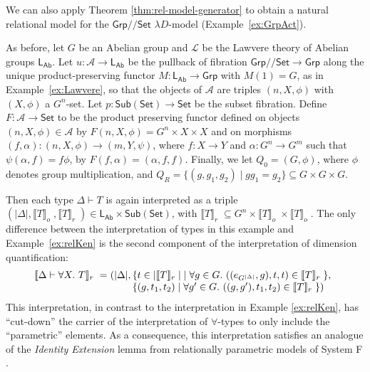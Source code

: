 \documentclass[a4paper,UKenglish]{lipics}
\newcommand{\msf}[1]{\mathsf{#1}} %
\newcommand{\Grp}{\msf{Grp}}
\newcommand{\Set}{\msf{Set}}
\newcommand{\Sub}[1]{\msf{Sub}(#1)}
\newcommand{\LAb}{\msf{L}_{\msf{Ab}}}
\newcommand{\A}{\mathcal{A}}
\newcommand{\Lslice}[1]{#1/\!/\Set}
\newcommand{\GrpSet}{\Lslice{\Grp}}
\newcommand{\semo}[1]{\ensuremath{\llbracket #1 \rrbracket _o} \;}
\newcommand{\semr}[1]{\ensuremath{\llbracket #1 \rrbracket _r} \;}
\begin{document}
We can also apply Theorem \ref{thm:rel-model-generator} to obtain a natural relational model for the $\GrpSet$ $\lambda D$-model (Example~\ref{ex:GrpAct}).

\begin{example}\label{ex:relMon}
As before, let $G$ be an Abelian group and $\mathcal{L}$ be the Lawvere theory of Abelian groups $\LAb$. Let $u:\A\to\LAb$ be the pullback of fibration $\GrpSet\to\Grp$ along the unique product-preserving functor $M:\LAb\to\Grp$ with $M(1)=G$, as in Example~\ref{ex:Lawvere}, so that the objects of $\A$ are triples $(n,X,\phi)$ with $(X,\phi)$ a $G^n$-set. Let $p:\Sub{\Set} \rightarrow \Set$ be the subset fibration. Define $F:\A\rightarrow \Set$ to be the product preserving functor defined on objects $(n,X,\phi) \in \A$ by $F(n,X, \phi) = G^{n} \times X \times X$ and on morphisms $(f, \alpha) : (n,X,\phi) \rightarrow (m, Y,\psi)$, where $f: X \rightarrow Y$ and $\alpha : G^n \rightarrow G^m$ such that $\psi (\alpha, f) = f \phi$, by $F(f,\alpha) = (\alpha, f, f)$. Finally, we let $Q_0 = (G,\phi)$, where $\phi$ denotes group multiplication, and $Q_R = \{(g,g_1,g_2) \mathrel| gg_1 = g_2 \} \subseteq G \times G \times G$.

  Then each type $\Delta \vdash T$ is again interpreted as a triple
  $(|\Delta|, \semo{T}, \semr{T}) \in \LAb \times \Sub{\Set}$, with
  $\semr{T} \subseteq G^n \times \semo{T} \times \semo{T}$. The only
  difference between the interpretation of types in this example and
  Example~\ref{ex:relKen} is the second component of the
  interpretation of dimension quantification:
  \begin{displaymath}
    \begin{array}{l@{\hspace{0.3em}}c@{\hspace{0.3em}}l}
      \semr{\Delta \vdash \forall X.~T} & = & (|\Delta|,
      \begin{array}[t]{@{}l}
        \{ t \in |\semr{T}| \mathrel| \forall g \in G.~((e_{G^{|\Delta|}},g), t, t) \in \semr{T} \},\\
        \{ (g, t_1, t_2) \mathrel| \forall g' \in G.~((g,g'), t_1, t_2) \in \semr{T} \} )
      \end{array}
    \end{array}
  \end{displaymath}
  This interpretation, in contrast to the interpretation in Example
  \ref{ex:relKen}, has ``cut-down'' the carrier of the interpretation
  of $\forall$-types to only include the ``parametric'' elements. As a
  consequence, this interpretation satisfies an analogue of the
  \emph{Identity Extension} lemma from relationally parametric models
  of System F \cite{reynolds1983types}.


\end{example}
\end{document}
